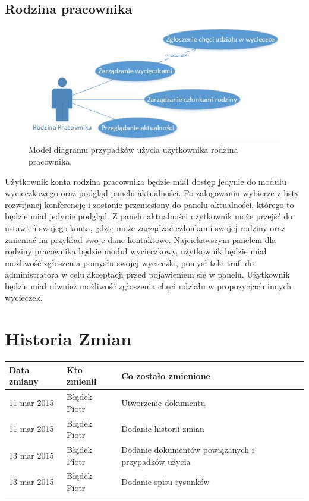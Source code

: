 \subsection{Rodzina pracownika}

\begin{figure}[!tb]
    \centering
    \includegraphics{rodzina.jpg}
    \caption{Model diagramu przypadków użycia użytkownika rodzina pracownika.}
    \label{fig:rodzina}
\end{figure}

Użytkownik konta rodzina pracownika będzie miał dostęp jedynie do modułu wycieczkowego oraz podgląd panelu aktualności. Po zalogowaniu wybierze z listy rozwijanej konferencję i zostanie przeniesiony do panelu aktualności, którego to będzie miał jedynie podgląd. Z panelu aktualności użytkownik może przejść do ustawień swojego konta, gdzie może zarządzać członkami swojej rodziny oraz zmieniać na przykład swoje dane kontaktowe. \newline
Najciekawszym panelem dla rodziny pracownika będzie moduł wycieczkowy, użytkownik będzie miał możliwość zgłoszenia pomysłu swojej wycieczki, pomysł taki trafi do administratora w celu akceptacji przed pojawieniem się w panelu. Użytkownik będzie miał również możliwość zgłoszenia chęci udziału w propozycjach innych wycieczek.

\section{Historia Zmian}

\begin{tabularx}{\textwidth}{X|l|X}
\hline
\textbf{Data zmiany} & \textbf{Kto zmienił} & \textbf{Co zostało zmienione} \\ \hline
11 mar 2015          & Błądek Piotr         & Utworzenie dokumentu          \\ \hline
11 mar 2015          &Błądek Piotr          &  Dodanie historii zmian            \\ \hline
13 mar 2015          &Błądek Piotr          &  Dodanie dokumentów powiązanych i przypadków użycia            \\ \hline
13 mar 2015          &Błądek Piotr          &  Dodanie spisu rysunków            \\ \hline
\end{tabularx}